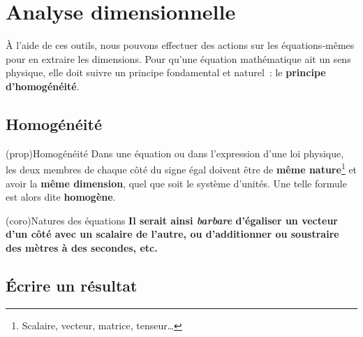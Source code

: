 \documentclass[../../main/main.tex]{subfiles}
\begin{document}
\section{Analyse dimensionnelle}

À l'aide de ces outils, nous pouvons effectuer des actions sur les
équations-mêmes pour en extraire les dimensions. Pour qu'une équation
mathématique ait un sens physique, elle doit suivre un principe fondamental et
naturel~: le \textbf{principe d'homogénéité}.

\subsection{Homogénéité}

\begin{tcb*}(prop){Homogénéité}
	Dans une équation ou dans l'expression d'une loi physique, les deux
	membres de chaque côté du signe égal doivent être de \textbf{même
		nature}\footnote{Scalaire, vecteur, matrice, tenseur…} et avoir la
	\textbf{même dimension}, quel que soit le système d'unités. Une telle
	formule est alors dite \textbf{homogène}.
\end{tcb*}
\begin{tcb*}[cnt](coro){Natures des équations}
	\bfseries Il serait ainsi \textit{barbare} d'égaliser un vecteur d'un côté
	avec un scalaire de l'autre, ou d'additionner ou soustraire
	des mètres à des secondes, etc.
\end{tcb*}

\subsection{Écrire un résultat}
\end{document}
